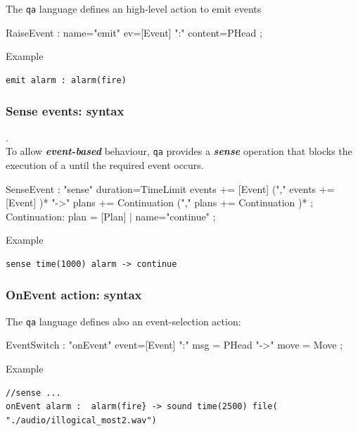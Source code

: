 The \texttt{qa} language defines an high-level action to emit events
 
\begin{javacode}  
 RaiseEvent : name="emit" ev=[Event] ":" content=PHead  ;
\end{javacode}
	
\noindent Example 
\begin{Verbatim}[fontsize=\scriptsize, frame=single]
emit alarm : alarm(fire)
\end{Verbatim}

 


 
\subsubsection{Sense events: syntax}.\\
To allow \textit{\textbf{event-based}} behaviour, \texttt{qa} provides a \textit{\textbf{sense}} operation that blocks the execution of a \qa{} until the required event occurs. 

 
 
\begin{javacode}  
SenseEvent : "sense" duration=TimeLimit events += [Event] ("," events += [Event] )*  
		"->" plans += Continuation ("," plans += Continuation )* ; 
Continuation: plan = [Plan] |  name="continue"  ;
\end{javacode}
 

\noindent Example
\begin{Verbatim}[fontsize=\scriptsize, frame=single]
sense time(1000) alarm -> continue
\end{Verbatim}


 
\subsubsection{OnEvent action: syntax }
The \texttt{qa} language defines also an event-selection  action: 
 
\begin{javacode}  
EventSwitch : "onEvent" event=[Event]  ":" msg = PHead "->" move = Move  ;
\end{javacode}

\noindent Example 
\medskip 
\begin{Verbatim}[fontsize=\scriptsize, frame=single]
//sense ...
onEvent alarm :  alarm(fire} -> sound time(2500) file( "./audio/illogical_most2.wav") 
\end{Verbatim}	

